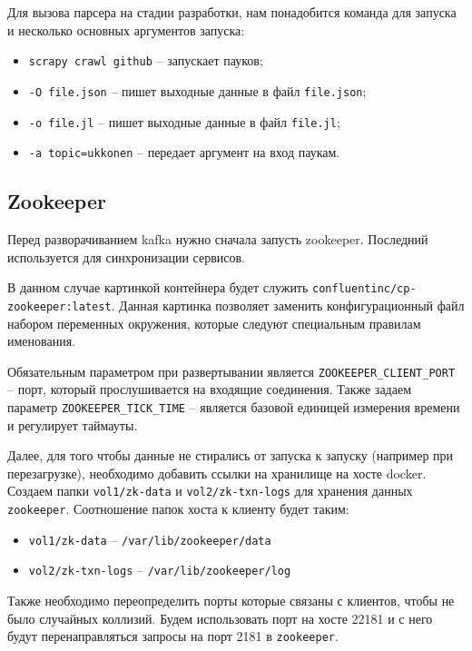 Для вызова парсера на стадии разработки, нам понадобится команда для запуска и
несколько основных аргументов запуска:
\begin{itemize}
    \item \verb|scrapy crawl github| -- запускает пауков;
    \item \verb|-O file.json| -- пишет выходные данные в файл \verb|file.json|;
    \item \verb|-o file.jl| -- пишет выходные данные в файл \verb|file.jl|;
    \item \verb|-a topic=ukkonen| -- передает аргумент на вход паукам.
\end{itemize}


\subsection{Zookeeper}
Перед разворачиванием kafka нужно сначала запусть zookeeper. Последний используется для синхронизации сервисов.

В данном случае картинкой контейнера будет служить
\verb|confluentinc/cp-zookeeper:latest|. Данная картинка позволяет заменить
конфигурационный файл набором переменных окружения, которые следуют специальным
правилам именования.

Обязательным параметром при развертывании является \verb|ZOOKEEPER_CLIENT_PORT|
-- порт, который прослушивается на входящие соединения. Также задаем параметр
\verb|ZOOKEEPER_TICK_TIME| -- является базовой единицей измерения времени и
регулирует таймауты.

Далее, для того чтобы данные не стирались от запуска к запуску (например при
перезагрузке), необходимо добавить ссылки на хранилище на хосте docker. Создаем
папки \verb|vol1/zk-data| и \verb|vol2/zk-txn-logs| для хранения данных
\verb|zookeeper|. Соотношение папок хоста к клиенту будет таким:
\begin{itemize}
    \item \verb|vol1/zk-data| -- \verb|/var/lib/zookeeper/data|
    \item \verb|vol2/zk-txn-logs| -- \verb|/var/lib/zookeeper/log|
\end{itemize}

Также необходимо переопределить порты которые связаны с клиентов, чтобы не было
случайных коллизий. Будем использовать порт на хосте 22181 и с него будут
перенаправляться запросы на порт 2181 в \verb|zookeeper|.

